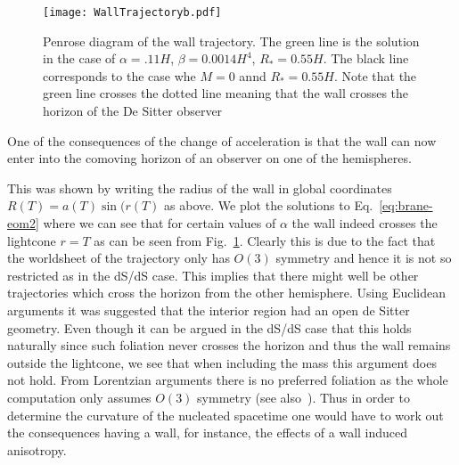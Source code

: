 \documentclass[a4paper,11pt]{article}
\numberwithin{equation}{section}
\numberwithin{equation}{section}
\begin{document}
\begin{figure}[h!] 
\begin{center} 
\texttt{[image: WallTrajectoryb.pdf]}
\caption{\footnotesize{Penrose diagram of the wall trajectory. The green line is the solution in the case of $\alpha=.11H$, $\beta= 0.0014 H^4$, $R_*=0.55 H$.  The black line corresponds to the case whe $M=0$ annd $R_*=0.55 H$.  Note that the green line crosses the dotted line meaning that the wall crosses the horizon of the De Sitter observer } \label{fig:WallTrajectory}}
\end{center} 
\end{figure}
One of the consequences of the change of acceleration is that the wall can now enter into the comoving horizon of an observer on one of the hemispheres.  

This was shown by writing the radius of the wall in global coordinates $R(T)=a(T)\sin(r(T)$ as above.
 We plot the solutions to Eq.~\eqref{eq:brane-eom2} where we can see that for certain values of $\alpha$ the wall indeed crosses the lightcone $r=T$ as can be seen from Fig.~\ref{fig:WallTrajectory}.  Clearly this is due to the fact that the worldsheet of the trajectory  only has $O(3)$ symmetry and hence it is not so restricted as in the dS/dS case.  This implies that there might well be other trajectories which cross the horizon from the other hemisphere.  Using Euclidean arguments \cite{Coleman:1980aw} it was suggested that the interior region had an open de Sitter geometry.  Even though it can be argued in the dS/dS case that this holds naturally since such foliation never crosses the horizon and thus the wall remains outside the lightcone, we see that when including the mass this argument does not hold.  From Lorentzian arguments there is no preferred foliation as the whole computation only assumes $O(3)$ symmetry (see also~\cite{Cespedes:2020xpn, Cespedes:2021oso}).  Thus in order to determine the curvature of the nucleated spacetime one would have to work out the consequences having a wall,  for instance,  the effects of a wall induced anisotropy. 
\end{document}
